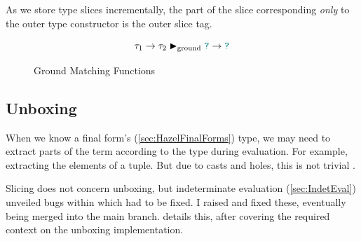As we store type slices incrementally, the part of the slice corresponding \textit{only} to the outer type constructor is the outer slice tag.

\begin{figure}
\[\tau_1 \to \tau_2 \blacktriangleright_{\text{ground}} {\color{teal}\texttt{?}} \to {\color{teal}\texttt{?}}\]
\caption{Ground Matching Functions}
\label{fig:GroundFunction}
\end{figure}

\subsection{Unboxing}
When we know a final form's (\cref{sec:HazelFinalForms}) type, we may need to extract parts of the term according to the type during evaluation. For example, extracting the elements of a tuple. But due to casts and holes, this is not trivial \cite{LivePatternMatching}.

Slicing does not concern unboxing, but indeterminate evaluation (\cref{sec:IndetEval}) unveiled bugs within which had to be fixed. I raised and fixed these, eventually being merged into the main branch.  details this, after covering the required context on the unboxing implementation.

